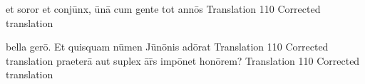 \documentclass[]{article}
\begin{document}
\latline
  {et soror et conj\={\macron u}nx, \={\macron u}n\={\macron a} cum gente tot ann\={\macron o}s}
  {Translation}
  {110} %
  {Corrected translation}
  {
  }

\latline
  {bella ger\={\macron o}.  Et quisquam n\={\macron u}men J\={\macron u}n\={\macron o}nis ad\={\macron o}rat}
  {Translation}
  {110} %
  {Corrected translation}
  {
  }
\newpage
\latline
  {praeter\={\macron a} aut suplex \={\macron a}r\={\macron{\i}}s imp\={\macron o}net hon\={\macron o}rem?}
  {Translation}
  {110} %
  {Corrected translation}
  {
  }
\end{document}
